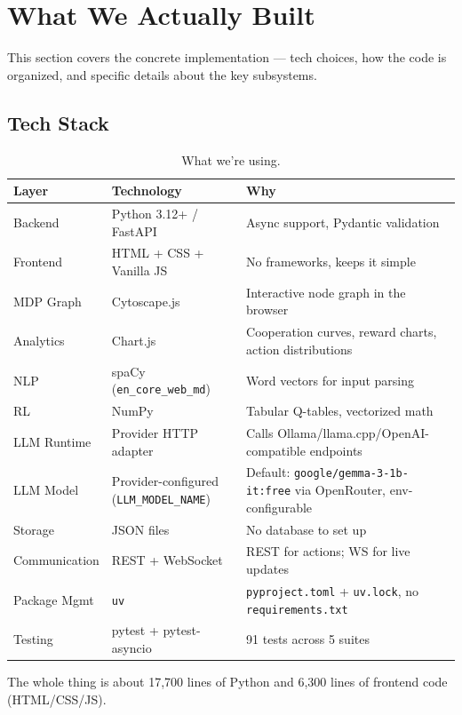 \section{What We Actually Built}
\label{sec:implementation}

This section covers the concrete implementation --- tech choices, how the code is organized, and specific details about the key subsystems.

\subsection{Tech Stack}

\begin{table}[ht]
\centering
\caption{What we're using.}
\label{tab:stack}
\begin{tabular}{@{}llp{7cm}@{}}
\toprule
Layer & Technology & Why \\
\midrule
Backend & Python 3.12+ / FastAPI & Async support, Pydantic validation \\
Frontend & HTML + CSS + Vanilla JS & No frameworks, keeps it simple \\
MDP Graph & Cytoscape.js & Interactive node graph in the browser \\
Analytics & Chart.js & Cooperation curves, reward charts, action distributions \\
NLP & spaCy (\texttt{en\_core\_web\_md}) & Word vectors for input parsing \\
RL & NumPy & Tabular Q-tables, vectorized math \\
LLM Runtime & Provider HTTP adapter & Calls Ollama/llama.cpp/OpenAI-compatible endpoints \\
LLM Model & Provider-configured (\texttt{LLM\_MODEL\_NAME}) & Default: \texttt{google/gemma-3-1b-it:free} via OpenRouter, env-configurable \\
Storage & JSON files & No database to set up \\
Communication & REST + WebSocket & REST for actions; WS for live updates \\
Package Mgmt & \texttt{uv} & \texttt{pyproject.toml} + \texttt{uv.lock}, no \texttt{requirements.txt} \\
Testing & pytest + pytest-asyncio & 91 tests across 5 suites \\
\bottomrule
\end{tabular}
\end{table}

The whole thing is about 17,700 lines of Python and 6,300 lines of frontend code (HTML/CSS/JS).

